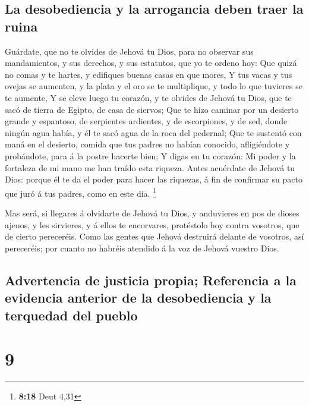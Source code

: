 \hypertarget{la-desobediencia-y-la-arrogancia-deben-traer-la-ruina}{%
\subsection{La desobediencia y la arrogancia deben traer la
ruina}\label{la-desobediencia-y-la-arrogancia-deben-traer-la-ruina}}

 Guárdate, que no te olvides de Jehová tu Dios, para no
observar sus mandamientos, y sus derechos, y sus estatutos, que yo te
ordeno hoy:  Que quizá no comas y te hartes, y edifiques
buenas casas en que mores,  Y tus vacas y tus ovejas se
aumenten, y la plata y el oro se te multiplique, y todo lo que tuvieres
se te aumente,  Y se eleve luego tu corazón, y te olvides
de Jehová tu Dios, que te sacó de tierra de Egipto, de casa de siervos;
 Que te hizo caminar por un desierto grande y espantoso,
de serpientes ardientes, y de escorpiones, y de sed, donde ningún agua
había, y él te sacó agua de la roca del pedernal;  Que te
sustentó con maná en el desierto, comida que tus padres no habían
conocido, afligiéndote y probándote, para á la postre hacerte bien;
 Y digas en tu corazón: Mi poder y la fortaleza de mi
mano me han traído esta riqueza.  Antes acuérdate de
Jehová tu Dios: porque él te da el poder para hacer las riquezas, á fin
de confirmar su pacto que juró á tus padres, como en este día.
\footnote{\textbf{8:18} Deut 4,31}

 Mas será, si llegares á olvidarte de Jehová tu Dios, y
anduvieres en pos de dioses ajenos, y les sirvieres, y á ellos te
encorvares, protéstolo hoy contra vosotros, que de cierto pereceréis.
 Como las gentes que Jehová destruirá delante de
vosotros, así pereceréis; por cuanto no habréis atendido á la voz de
Jehová vuestro Dios.

\hypertarget{advertencia-de-justicia-propia-referencia-a-la-evidencia-anterior-de-la-desobediencia-y-la-terquedad-del-pueblo}{%
\subsection{Advertencia de justicia propia; Referencia a la evidencia
anterior de la desobediencia y la terquedad del
pueblo}\label{advertencia-de-justicia-propia-referencia-a-la-evidencia-anterior-de-la-desobediencia-y-la-terquedad-del-pueblo}}

\hypertarget{section-8}{%
\section{9}\label{section-8}}


